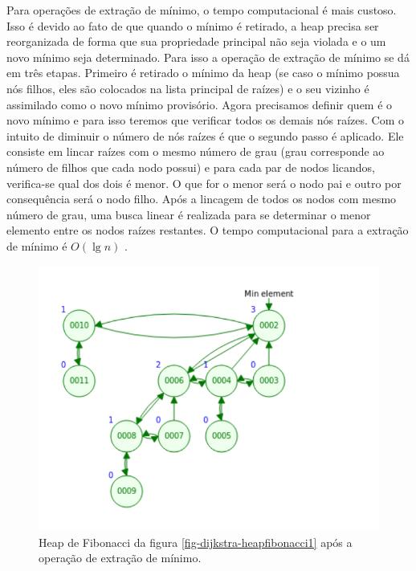 Para operações de extração de mínimo, o tempo computacional é mais custoso. Isso é devido ao fato de que quando o mínimo é retirado, a heap precisa ser reorganizada de forma que sua propriedade principal não seja violada e o um novo mínimo seja determinado. Para isso a operação de extração de mínimo se dá em três etapas. Primeiro é retirado o mínimo da heap (se caso o mínimo possua nós filhos, eles são colocados na lista principal de raízes) e o seu vizinho é assimilado como o novo mínimo provisório. Agora precisamos definir quem é o novo mínimo e para isso teremos que verificar todos os demais nós raízes. Com o intuito de diminuir o número de nós raízes é que o segundo passo é aplicado.  Ele consiste em lincar raízes com o mesmo número de grau (grau corresponde ao número de filhos que cada nodo possui) e para cada par de nodos licandos, verifica-se qual dos dois é menor. O que for o menor será o nodo pai e outro por consequência será o nodo filho. Após a lincagem de todos os nodos com mesmo número de grau, uma busca linear é realizada para se determinar o menor elemento entre os nodos raízes restantes. O tempo computacional para a extração de mínimo é $O(\lg n)$ \cite{cormen2009introduction}.


\begin{figure}[H]
\centering
\includegraphics[width=.75\textwidth]{figuras/fibonacci-heap2} 
\caption{Heap de Fibonacci da figura \ref{fig-dijkstra-heapfibonacci1} após a operação de extração de mínimo.}
\label{fig-dijkstra-heapfibonacci2}
\end{figure}


